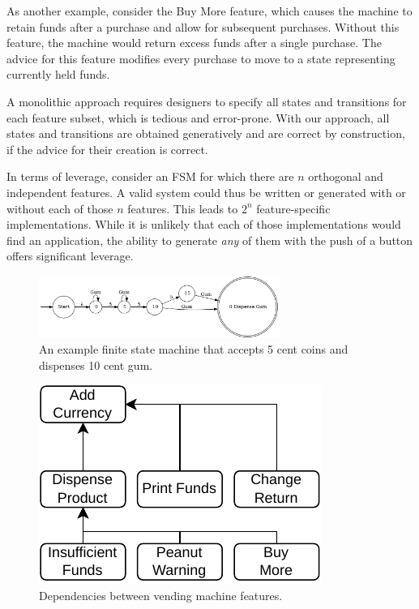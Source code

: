 \documentclass[sigplan,anonymous,review]{acmart}
\begin{document}
As another example, consider the Buy More feature, which causes the machine to retain funds after a purchase and allow for subsequent purchases.  Without this feature, the machine would return excess funds after a single purchase.  The advice for this feature modifies every purchase to move to a state representing currently held funds.

A monolithic approach requires designers to specify all states and transitions for each feature subset, which is tedious and error-prone. With our approach, all states and transitions are obtained generatively and are correct by construction, if the advice for their creation is correct.

In terms of leverage, consider an FSM for which there are $n$ orthogonal and independent features.  A valid system could thus be written or generated with or without each of those $n$ features.  This leads to $2^{n}$ feature-specific implementations.  While it is unlikely that each of those implementations would find an application, the ability to generate \emph{any} of them with the push of a button offers significant leverage.

\begin{figure}
    \centering
    \includegraphics[width=0.7\textwidth]{figures/vend1.pdf}
    \caption{An example finite state machine that accepts 5 cent coins and dispenses 10 cent gum.}
    \label{fig:vend1}
\end{figure}

\begin{figure}
    \centering
    \includegraphics[width=0.5\linewidth]{figures/VendingMachine.pdf}
    \caption{Dependencies between vending machine features.}
    \label{fig:vmDependencies}
\end{figure}
\end{document}
